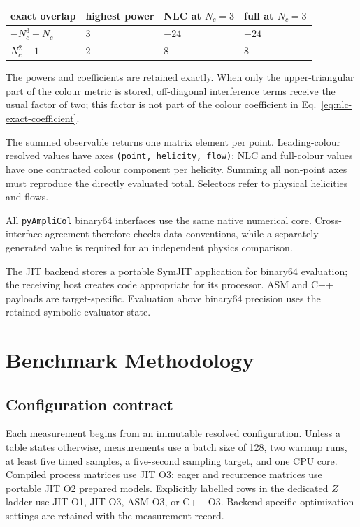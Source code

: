 \documentclass[10pt,letterpaper]{article}
\newcommand{\PAC}{\texttt{pyAmpliCol}}
\begin{document}
\begin{center}
\begin{tabular}{@{}L{1.45in}L{1.20in}L{1.35in}L{1.35in}@{}}
\toprule
\textbf{exact overlap} & \textbf{highest power} &
  \textbf{NLC at \(N_c=3\)} & \textbf{full at \(N_c=3\)} \\
\midrule
\(-N_c^3+N_c\) & \(3\) & \(-24\) & \(-24\) \\
\(N_c^2-1\) & \(2\) & \(8\) & \(8\) \\
\bottomrule
\end{tabular}
\end{center}

The powers and coefficients are retained exactly.  When only the
upper-triangular part of the colour metric is stored, off-diagonal interference
terms receive the usual factor of two; this factor is not part of the colour
coefficient in Eq.~\eqref{eq:nlc-exact-coefficient}.

The summed observable returns one matrix element per point.  Leading-colour
resolved values have axes \texttt{(point, helicity, flow)}; NLC and full-colour
values have one contracted colour component per helicity. Summing all
non-point axes must reproduce the directly evaluated total. Selectors refer to
physical helicities and flows.

All \PAC{} binary64 interfaces use the same native numerical core.
Cross-interface agreement therefore checks data conventions, while a
separately generated value is required for an independent physics comparison.

The JIT backend stores a portable SymJIT application for binary64 evaluation;
the receiving host creates code appropriate for its processor. ASM and C++
payloads are target-specific. Evaluation above binary64 precision uses the
retained symbolic evaluator state.

\section{Benchmark Methodology}

\subsection{Configuration contract}

Each measurement begins from an immutable resolved configuration. Unless a
table states otherwise, measurements use a batch size of 128, two warmup runs,
at least five timed samples, a five-second sampling target, and one CPU core.
Compiled process matrices use JIT O3; eager and recurrence matrices use
portable JIT O2 prepared models. Explicitly labelled rows in the dedicated
\(Z\) ladder use JIT O1, JIT O3, ASM O3, or C++ O3. Backend-specific
optimization settings are retained with the measurement record.
\end{document}

